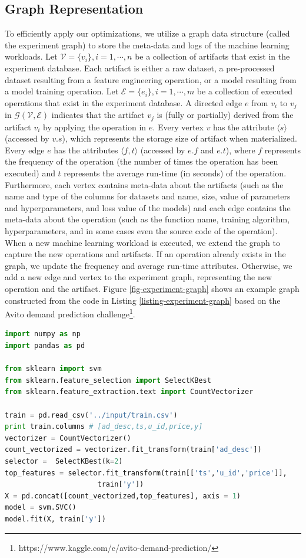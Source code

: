 \subsection{Graph Representation}\label{sub-graph-construction}
To efficiently apply our optimizations, we utilize a graph data structure (called the experiment graph) to store the meta-data and logs of the machine learning workloads.
Let $\mathcal{V}=\{v_i\}, i = 1, \cdots, n$ be a collection of artifacts that exist in the experiment database.
Each artifact is either a raw dataset, a pre-processed dataset resulting from a feature engineering operation, or a model resulting from a model training operation.
Let $\mathcal{E}=\{e_i\}, i = 1, \cdots, m$ be a collection of executed operations that exist in the experiment database.
A directed edge $e$ from $v_i$ to $v_j$ in $\mathcal{G}(\mathcal{V},\mathcal{E})$ indicates that the artifact $v_j$ is (fully or partially) derived from the artifact $v_i$ by applying the operation in $e$.
Every vertex $v$ has the attribute $\langle s \rangle$ (accessed by $v.s$), which represents the storage size of artifact when materialized.
Every edge $e$ has the attributes $\langle f, t\rangle$ (accessed by $e.f$ and $e.t$), where $f$ represents the frequency of the operation (the number of times the operation has been executed) and $t$ represents the average run-time (in seconds) of the operation.
Furthermore, each vertex contains meta-data about the artifacts (such as the name and type of the columns for datasets and name, size, value of parameters and hyperparameters, and loss value of the models) and each edge contains the meta-data about the operation (such as the function name, training algorithm, hyperparameters, and in some cases even the source code of the operation).
When a new machine learning workload is executed, we extend the graph to capture the new operations and artifacts.
If an operation already exists in the graph, we update the frequency and average run-time attributes.
Otherwise, we add a new edge and vertex to the experiment graph, representing the new operation and the artifact.
Figure \ref{fig-experiment-graph} shows an example graph constructed from the code in Listing \ref{listing-experiment-graph} based on the Avito demand prediction challenge\footnote{https://www.kaggle.com/c/avito-demand-prediction/}.

\begin{lstlisting}[language=Python, caption=Example script,captionpos=b,label = {listing-experiment-graph}]
import numpy as np
import pandas as pd

from sklearn import svm
from sklearn.feature_selection import SelectKBest
from sklearn.feature_extraction.text import CountVectorizer

train = pd.read_csv('../input/train.csv') 
print train.columns # [ad_desc,ts,u_id,price,y]
vectorizer = CountVectorizer()
count_vectorized = vectorizer.fit_transform(train['ad_desc'])
selector =  SelectKBest(k=2)
top_features = selector.fit_transform(train[['ts','u_id','price']], 
				      train['y'])
X = pd.concat([count_vectorized,top_features], axis = 1)
model = svm.SVC()
model.fit(X, train['y'])
\end{lstlisting}

